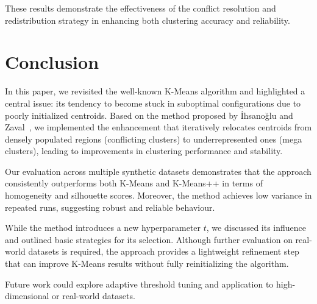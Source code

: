 \documentclass[10pt,twocolumn,letterpaper]{article}
\begin{document}
These results demonstrate the effectiveness of the conflict resolution and
redistribution strategy in enhancing both clustering accuracy and reliability.


\section{Conclusion}\label{sec:conclusion}

In this paper, we revisited the well-known K-Means algorithm and highlighted a
central issue: its tendency to become stuck in suboptimal configurations due to
poorly initialized centroids. Based on the method proposed by İhsanoğlu and
Zaval~\cite{Abdullah10601123}, we implemented the enhancement that iteratively
relocates centroids from densely populated regions (conflicting clusters) to
underrepresented ones (mega clusters), leading to improvements in clustering
performance and stability.

Our evaluation across multiple synthetic datasets demonstrates that the
approach consistently outperforms both K-Means and K-Means++ in terms of
homogeneity and silhouette scores. Moreover, the method achieves low variance
in repeated runs, suggesting robust and reliable behaviour.

While the method introduces a new hyperparameter $t$, we discussed its
influence and outlined basic strategies for its selection. Although further
evaluation on real-world datasets is required, the approach provides a
lightweight refinement step that can improve K-Means results without fully
reinitializing the algorithm.

Future work could explore adaptive threshold tuning and application to
high-dimensional or real-world datasets.



    {\small
        
        
    }
\end{document}
